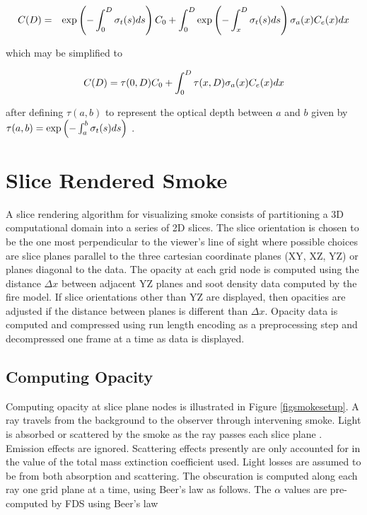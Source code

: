 \begin{eqnarray*}
C(D)&=&\exp\left({-\int_0^D \sigma_t(s) ds}\right) C_0+ \int_0^D\exp\left({-\int_x^D \sigma_t(s) ds}\right)\sigma_a(x) C_e(x) dx\\
\end{eqnarray*}

which may be simplified to

\begin{equation}
 C(D)=\tau(0,D)C_0 + \int_0^D\tau(x,D)\sigma_a(x)C_e(x) dx
\end{equation}

after defining $\tau(a,b)$ to represent the optical depth between $a$ and $b$ given by $\tau(a,b)=\exp\left({-\int_a^b \sigma_t(s) ds}\right)$ .

%
%

\section{Slice Rendered Smoke}
A slice rendering algorithm for visualizing smoke consists of partitioning a 3D computational domain into a series of 2D slices.  The slice orientation is chosen to be the one most perpendicular to the viewer's line of sight where possible choices are slice planes parallel to the three cartesian coordinate planes (XY, XZ, YZ) or planes diagonal to the data.  The opacity at each grid node is computed using the distance $\Delta x$ between adjacent YZ planes and soot density data computed by the fire model.  If slice orientations other than YZ are displayed, then opacities are adjusted if the distance between planes is different than $\Delta x$.  Opacity data is computed and compressed using run length encoding as a preprocessing step and decompressed one frame at a time as data is displayed.


%
%

\subsection{Computing Opacity}
Computing opacity at slice plane nodes is illustrated in Figure \ref{figsmokesetup}. A ray travels from the background to the observer through intervening smoke. Light is absorbed or scattered by the smoke as the ray passes each slice plane .  Emission effects are ignored. Scattering effects presently are only accounted for in the value of the total mass extinction coefficient used.  Light losses are assumed to be from both absorption and scattering. The obscuration is computed along each ray one grid plane at a time, using Beer's law as follows.  The $\alpha$ values are pre-computed by FDS using Beer's law~\cite{Siegel:2001}

